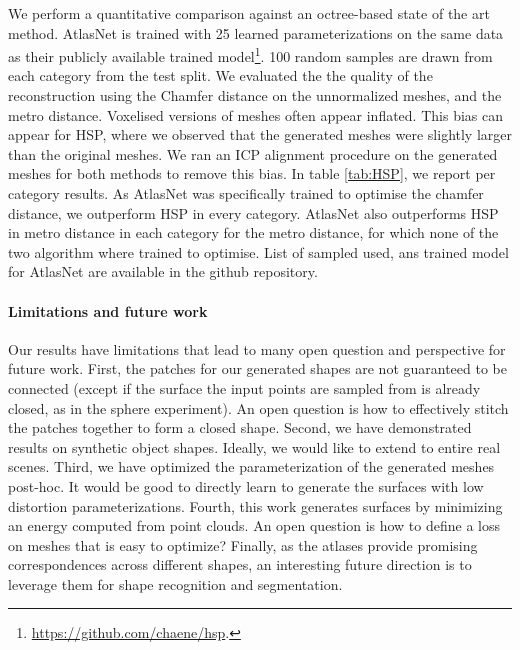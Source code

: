 \documentclass[10pt,twocolumn,letterpaper]{article}
\begin{document}
We perform a quantitative comparison against an octree-based state of the art method. AtlasNet is trained with 25 learned parameterizations on the same data as their publicly available trained model\footnote{\url{https://github.com/chaene/hsp}.}. 100 random samples are drawn from each category from the test split. We evaluated the the quality of the reconstruction using the Chamfer distance on the unnormalized meshes, and the metro distance. Voxelised versions of meshes often appear inflated. This bias can appear for HSP, where we observed that the generated meshes were slightly larger than the original meshes. We ran an ICP alignment procedure on the generated meshes for both methods to remove this bias. In table \ref{tab:HSP}, we report per category results. As AtlasNet was specifically trained to optimise the chamfer distance, we outperform HSP in every category. AtlasNet also outperforms HSP in metro distance in each category for the metro distance, for which none of the two algorithm where trained to optimise. List of sampled used, ans trained model for AtlasNet are available in the github repository.



\paragraph{Limitations and future work}

Our results have limitations that lead to many open question and perspective for future work.
First, the patches for our generated shapes are not guaranteed to be connected (except if the surface the input points are sampled from is already closed, as in the sphere experiment). An open question is how to effectively stitch the patches together to form a closed shape.
Second, we have demonstrated results on synthetic object shapes. Ideally, we would like to extend to entire real scenes.
Third, we have optimized the parameterization of the generated meshes post-hoc. It would be good to directly learn to generate the surfaces with low distortion parameterizations.
Fourth, this work generates surfaces by minimizing an energy computed from point clouds. An open question is how to define a loss on meshes that is easy to optimize?
Finally, as the atlases provide promising correspondences across different shapes, an interesting future direction is to leverage them for shape recognition and segmentation.
\vspace*{-2pt}
\end{document}
